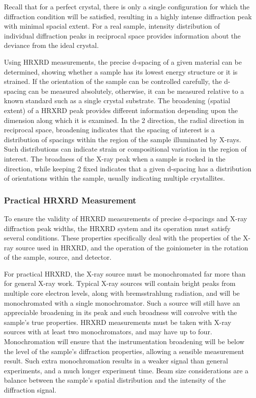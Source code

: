 Recall that for a perfect crystal, there is only a single configuration for which the diffraction condition will be satisfied, resulting in a highly intense diffraction peak with minimal spacial extent.
For a real sample, intensity distribution of individual diffraction peaks in reciprocal space provides information about the deviance from the ideal crystal.

Using HRXRD measurements, the precise d-spacing of a given material can be determined, showing whether a sample has its lowest energy structure or it is strained.
If the orientation of the sample can be controlled carefully, the d-spacing can be measured absolutely, otherwise, it can be measured relative to a known standard such as a single crystal substrate.
The broadening (spatial extent) of a HRXRD peak provides different information depending upon the dimension along which it is examined.
In the 2\straighttheta{} direction, the radial direction in reciprocal space, broadening indicates that the spacing of interest is a distribution of spacings within the region of the sample illuminated by X-rays.
Such distributions can indicate strain or compositional variation in the region of interest.
The broadness of the X-ray peak when a sample is rocked in the \textomega{} direction, while keeping 2\straighttheta{} fixed indicates that a given d-spacing has a distribution of orientations within the sample, usually indicating multiple crystallites.

\subsubsection{Practical HRXRD Measurement} To ensure the validity of HRXRD measurements of precise d-spacings and X-ray diffraction peak widths, the HRXRD system and its operation must satisfy several conditions.
These properties specifically deal with the properties of the X-ray source used in HRXRD, and the operation of the goiniometer in the rotation of the sample, source, and detector.

For practical HRXRD, the X-ray source must be monochromated far more than for general X-ray work.
Typical X-ray sources will contain bright peaks from multiple core electron levels, along with bremsstrahlung radiation, and will be monochromated with a single monochromator.
Such a source will still have an appreciable broadening in its peak and such broadness will convolve with the sample's true properties.
HRXRD measurements must be taken with X-ray sources with at least two monochromators, and may have up to four.
Monochromation will ensure that the instrumentation broadening will be below the level of the sample's diffraction properties, allowing a sensible measurement result.
Such extra monochromation results in a weaker signal than general experiments, and a much longer experiment time.
Beam size considerations are a balance between the sample's spatial distribution and the intensity of the diffraction signal.

